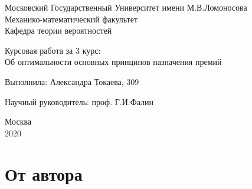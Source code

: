\documentclass[12pt,a4paper]{article}
\begin{document}
\begin{titlepage}

 \begin{center}
 Московский Государственный Университет имени М.В.Ломоносова \\
Механико-математический факультет\\
Кафедра теории вероятностей
  \end{center}

 \vspace{3cm}
 
 \begin{center}
   
  {  Курсовая работа за 3 курс:\\
  Об оптимальности основных принципов назначения премий}
   
    \vspace{5cm}
\end{center}     
   
     
   \hspace{170pt}  {Выполнила: Александра Токаева,  309 \\}
       
 \vspace{0.1cm}
  \hspace{170pt} 	  Научный руководитель:  проф. Г.И.Фалин\\

\vspace{4cm}

  \begin{center}
  {Москва\\
  2020}
  \end{center}  
  
\newpage
\tableofcontents
 
 
\end{titlepage}

\section{ От автора}
\end{document}
